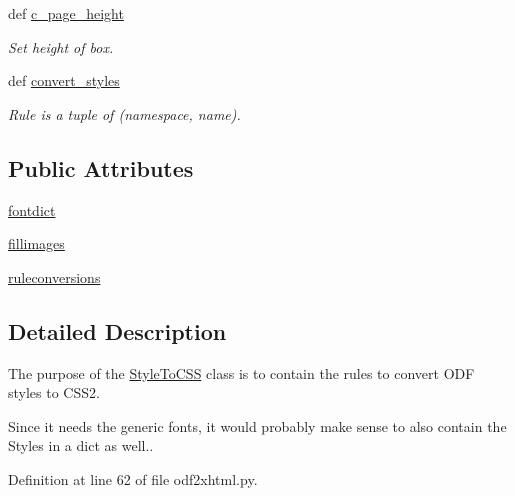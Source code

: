 \begin{DoxyCompactItemize}
def \hyperlink{classodf_1_1odf2xhtml_1_1StyleToCSS_a59dfb75146e43ea1cf6ba7c9e8ba3573}{c\+\_\+page\+\_\+height}
\begin{DoxyCompactList}\small\item\em Set height of box. \end{DoxyCompactList}\item 
def \hyperlink{classodf_1_1odf2xhtml_1_1StyleToCSS_a595651ab08545240168ab983cb69b229}{convert\+\_\+styles}
\begin{DoxyCompactList}\small\item\em Rule is a tuple of (namespace, name). \end{DoxyCompactList}\end{DoxyCompactItemize}
\subsection*{Public Attributes}
\begin{DoxyCompactItemize}
\item 
\hyperlink{classodf_1_1odf2xhtml_1_1StyleToCSS_abbf3b4ba96b5c3192a4fe55b768a0445}{fontdict}
\item 
\hyperlink{classodf_1_1odf2xhtml_1_1StyleToCSS_a8b624e6ed4d31d0e947239db1036e92c}{fillimages}
\item 
\hyperlink{classodf_1_1odf2xhtml_1_1StyleToCSS_a99d05d82ffecc1e04e1c9363db5ac14f}{ruleconversions}
\end{DoxyCompactItemize}


\subsection{Detailed Description}
The purpose of the \hyperlink{classodf_1_1odf2xhtml_1_1StyleToCSS}{Style\+To\+C\+S\+S} class is to contain the rules to convert O\+D\+F styles to C\+S\+S2. 

Since it needs the generic fonts, it would probably make sense to also contain the Styles in a dict as well.. 

Definition at line 62 of file odf2xhtml.\+py.



